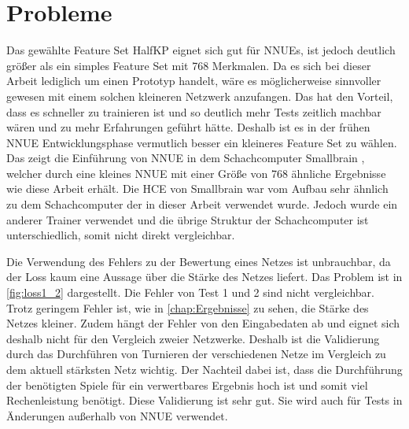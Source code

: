 \section{Probleme}

Das gewählte Feature Set HalfKP eignet sich gut für \acp{NNUE}, ist jedoch deutlich größer als ein simples Feature Set mit 768 Merkmalen. Da es sich bei dieser Arbeit lediglich um einen Prototyp handelt, wäre es möglicherweise sinnvoller gewesen mit einem solchen kleineren Netzwerk anzufangen. Das hat den Vorteil, dass es schneller zu trainieren ist und so deutlich mehr Tests zeitlich machbar wären und zu mehr Erfahrungen geführt hätte. Deshalb ist es in der frühen \ac{NNUE} Entwicklungsphase vermutlich besser ein kleineres Feature Set zu wählen. Das zeigt die Einführung von \ac{NNUE} in dem Schachcomputer Smallbrain \cite{Smallbrain}, welcher durch eine kleines \ac{NNUE} mit einer Größe von 768 ähnliche Ergebnisse wie diese Arbeit erhält. Die \ac{HCE} von Smallbrain war vom Aufbau sehr ähnlich zu dem Schachcomputer der in dieser Arbeit verwendet wurde. Jedoch wurde ein anderer Trainer verwendet und die übrige Struktur der Schachcomputer ist unterschiedlich, somit nicht direkt vergleichbar.

Die Verwendung des Fehlers zu der Bewertung eines Netzes ist unbrauchbar, da der Loss kaum eine Aussage über die Stärke des Netzes liefert. Das Problem ist in \autoref{fig:loss1_2} dargestellt. Die Fehler von Test 1 und 2 sind nicht vergleichbar. Trotz geringem Fehler ist, wie in \autoref{chap:Ergebnisse} zu sehen, die Stärke des Netzes kleiner. Zudem hängt der Fehler von den Eingabedaten ab und eignet sich deshalb nicht für den Vergleich zweier Netzwerke. Deshalb ist die Validierung durch das Durchführen von Turnieren der verschiedenen Netze im Vergleich zu dem aktuell stärksten Netz wichtig. Der Nachteil dabei ist, dass die Durchführung der benötigten Spiele für ein verwertbares Ergebnis hoch ist und somit viel Rechenleistung benötigt. Diese Validierung ist sehr gut. Sie wird auch für Tests in Änderungen außerhalb von \ac{NNUE} verwendet.

